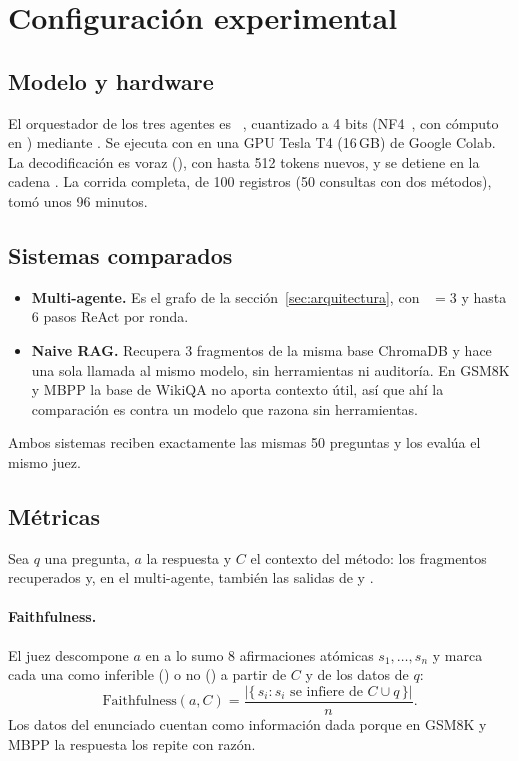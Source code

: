 \section{Configuración experimental}\label{sec:experimentos}

\subsection{Modelo y hardware}

El orquestador de los tres agentes es ~\cite{mistral}, cuantizado a 4 bits (NF4~\cite{qlora}, con cómputo en ) mediante .
Se ejecuta con  en una GPU Tesla T4 (16\,GB) de Google Colab.
La decodificación es voraz (), con hasta 512 tokens nuevos, y se detiene en la cadena .
La corrida completa, de 100 registros (50 consultas con dos métodos), tomó unos 96 minutos.

\subsection{Sistemas comparados}

\begin{itemize}
  \item \textbf{Multi-agente.} Es el grafo de la sección~\ref{sec:arquitectura}, con ~$=3$ y hasta 6 pasos ReAct por ronda.
  \item \textbf{Naive RAG.} Recupera 3 fragmentos de la misma base ChromaDB y hace una sola llamada al mismo modelo, sin herramientas ni auditoría.
  En GSM8K y MBPP la base de WikiQA no aporta contexto útil, así que ahí la comparación es contra un modelo que razona sin herramientas.
\end{itemize}

Ambos sistemas reciben exactamente las mismas 50 preguntas y los evalúa el mismo juez.

\subsection{Métricas}

Sea $q$ una pregunta, $a$ la respuesta y $C$ el contexto del método: los fragmentos recuperados y, en el multi-agente, también las salidas de  y .

\paragraph{Faithfulness.}
El juez descompone $a$ en a lo sumo 8 afirmaciones atómicas $s_1,\dots,s_n$ y marca cada una como inferible () o no () a partir de $C$ y de los datos de $q$:
\begin{equation}
  \text{Faithfulness}(a, C) = \frac{\left|\{\,s_i : s_i \text{ se infiere de } C \cup q\,\}\right|}{n}.
\end{equation}
Los datos del enunciado cuentan como información dada porque en GSM8K y MBPP la respuesta los repite con razón.

